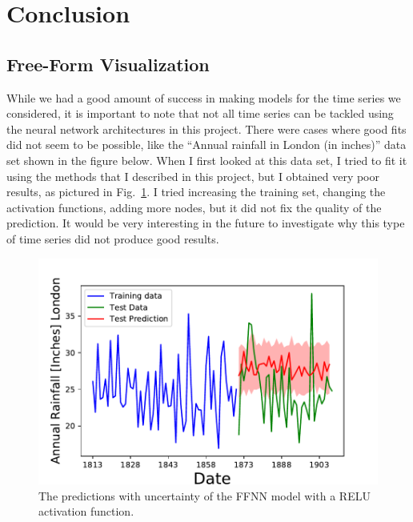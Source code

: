 \documentclass[10pt,a4paper]{article}
\begin{document}
\newpage
\section{Conclusion}
%
\subsection{Free-Form Visualization}
%
While we had a good amount of success in making models for the time series we considered, it is important to note that not all time series can be tackled using the neural network architectures in this project. There were cases where good fits did not seem to be possible, like the ``Annual rainfall in London (in inches)'' data set shown in the figure below. When I first looked at this data set, I tried to fit it using the methods that I described in this project, but I obtained very poor results, as pictured in Fig.~\ref{fig:results FNN rainfall}. I tried increasing the training set, changing the activation functions, adding more nodes, but it did not fix the quality of the prediction. It would be very interesting in the future to investigate why this type of time series did not produce good results.
\begin{figure}[h]
\centering
\includegraphics[scale=0.41]{Annual_Rainfall_NN_relu.pdf}
\caption{The predictions with uncertainty of the FFNN model with a RELU activation function.}
\label{fig:results FNN rainfall}
\end{figure}
\end{document}

